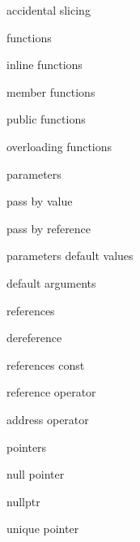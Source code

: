          accidental slicing 
        
         functions
        
         inline functions
        
         member functions

         public functions

        overloading functions
        
         parameters
        
         pass by value
        
         pass by reference

         parameters default values 

         default arguments
        
         references 
        
         dereference 
        
         references const 
        
         reference operator 
        
         address operator 
        
         pointers
        
         null pointer
        
         nullptr
        
         unique pointer
        
